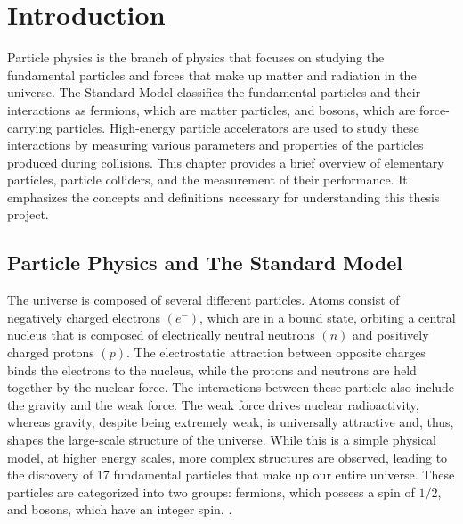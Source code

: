 \chapter{Introduction}
\label{ch1}

Particle physics is the branch of physics that focuses on studying the fundamental particles and forces that make up matter and radiation in the universe. The Standard Model classifies the fundamental particles and their interactions as fermions, which are matter particles, and bosons, which are force-carrying particles. High-energy particle accelerators are used to study these interactions by measuring various parameters and properties of the particles produced during collisions. This chapter provides a brief overview of elementary particles, particle colliders, and the measurement of their performance. It emphasizes the concepts and definitions necessary for understanding this thesis project.

\section{Particle Physics and The Standard Model}

The universe is composed of several different particles. Atoms consist of negatively charged electrons $(e^{-})$, which are in a bound state, orbiting a central nucleus that is composed of electrically neutral neutrons $(n)$ and positively charged protons $(p)$. The electrostatic attraction between opposite charges binds the electrons to the nucleus, while the protons and neutrons are held together by the nuclear force. The interactions between these particle also include the gravity and the weak force. The weak force drives nuclear radioactivity, whereas gravity, despite being extremely weak, is universally attractive and, thus, shapes the large-scale structure of the universe.
While this is a simple physical model, at higher energy scales, more complex structures are observed, leading to the discovery of 17 fundamental particles that make up our entire universe. These particles are categorized into two groups: fermions, which possess a spin of $1/2$, and bosons, which have an integer spin. \cite{thomson_2013}.\\

